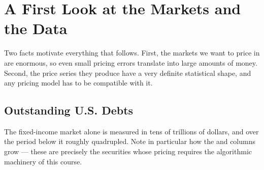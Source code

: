 \section{A First Look at the Markets and the Data}


\suppstart
Two facts motivate everything that follows.
First, the markets we want to price in are enormous, so even small pricing errors translate into large amounts of money.
Second, the price series they produce have a very definite statistical shape, and any pricing model has to be compatible with it.
\suppend

\subsection{Outstanding U.S. Debts}

\suppstart
The fixed-income market alone is measured in tens of trillions of dollars, and over the period below it roughly quadrupled.
Note in particular how the  and  columns grow --- these are precisely the securities whose pricing requires the algorithmic machinery of this course.
\suppend

